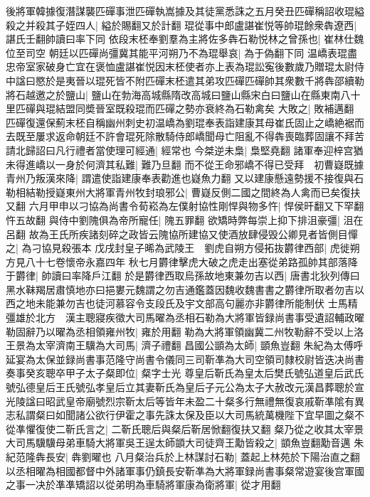 後將軍韓據復潛謀襲匹磾事泄匹磾執嵩據及其徒黨悉誅之五月癸丑匹磾稱詔收琨縊殺之并殺其子姪四人|{
	縊於賜翻又於計翻}
琨從事中郎盧諶崔悦等帥琨餘衆犇遼西|{
	諶氏壬翻帥讀曰率下同}
依段末柸奉劉羣為主將佐多犇石勒悦林之曾孫也|{
	崔林仕魏位至司空}
朝廷以匹磾尚彊冀其能平河朔乃不為琨舉哀|{
	為于偽翻下同}
温嶠表琨盡忠帝室家破身亡宜在褒恤盧諶崔悦因末柸使者亦上表為琨訟寃後數歲乃贈琨太尉侍中諡曰愍於是夷晉以琨死皆不附匹磾末柸遣其弟攻匹磾匹磾帥其衆數千將犇邵續勒將石越邀之於鹽山|{
	鹽山在勃海高城縣隋改高城曰鹽山縣宋白曰鹽山在縣東南八十里匹磾與琨結盟同奬晉室既殺琨而匹磾之勢亦衰終為石勒禽矣}
大敗之|{
	敗補邁翻}
匹磾復還保薊末柸自稱幽州刺史初温嶠為劉琨奉表詣建康其母崔氏固止之嶠絶裾而去既至屢求返命朝廷不許會琨死除散騎侍郎嶠聞母亡阻亂不得犇喪臨葬固讓不拜苦請北歸詔曰凡行禮者當使理可經通|{
	經常也}
今桀逆未梟|{
	梟堅堯翻}
諸軍奉迎梓宫猶未得進嶠以一身於何濟其私難|{
	難乃旦翻}
而不從王命邪嶠不得已受拜　初曹嶷既據青州乃叛漢來降|{
	謂遣使詣建康奉表勸進也嶷魚力翻}
又以建康懸遠勢援不接復與石勒相結勒授嶷東州大將軍青州牧封琅邪公|{
	曹嶷反側二國之間終為人禽而已矣復扶又翻}
六月甲申以刁協為尚書令荀崧為左僕射協性剛悍與物多忤|{
	悍侯旰翻又下罕翻忤五故翻}
與侍中劉隗俱為帝所寵任|{
	隗五罪翻}
欲矯時弊每崇上抑下排沮豪彊|{
	沮在呂翻}
故為王氏所疾諸刻碎之政皆云隗協所建協又使酒放肆侵毁公卿見者皆側目憚之|{
	為刁協見殺張本}
戊戌封皇子晞為武陵王　劉虎自朔方侵拓抜欝律西部|{
	虎徙朔方見八十七卷懷帝永嘉四年}
秋七月欝律擊虎大破之虎走出塞從弟路孤帥其部落降于欝律|{
	帥讀曰率降戶江翻}
於是欝律西取烏孫故地東兼勿吉以西|{
	唐書北狄列傳曰黑水靺羯居肅慎地亦曰挹婁元魏謂之勿吉通鑑蓋因魏收魏書書之欝律所取者勿吉以西之地未能兼勿吉也徒河慕容令支段氏及宇文部高句麗亦非欝律所能制伏}
士馬精彊雄於北方　漢主聰寢疾徵大司馬曜為丞相石勒為大將軍皆録尚書事受遺詔輔政曜勒固辭乃以曜為丞相領雍州牧|{
	雍於用翻}
勒為大將軍領幽冀二州牧勒辭不受以上洛王景為太宰濟南王驥為大司馬|{
	濟子禮翻}
昌國公顗為太師|{
	顗魚豈翻}
朱紀為太傅呼延宴為太保並録尚書事范隆守尚書令儀同三司靳凖為大司空領司隸校尉皆迭决尚書奏事癸亥聰卒甲子太子粲即位|{
	粲字士光}
尊皇后靳氏為皇太后樊氏號弘道皇后武氏號弘德皇后王氏號弘孝皇后立其妻靳氏為皇后子元公為太子大赦改元漢昌葬聰於宣光陵諡曰昭武皇帝廟號烈宗靳太后等皆年未盈二十粲多行無禮無復哀戚靳凖隂有異志私謂粲曰如聞諸公欲行伊霍之事先誅太保及臣以大司馬統萬機陛下宜早圖之粲不從凖懼復使二靳氏言之|{
	二靳氏聰后與粲后靳居惞翻復扶又翻}
粲乃從之收其太宰景大司馬驥驥母弟車騎大將軍吳王逞太師顗大司徒齊王勱皆殺之|{
	顗魚豈翻勱音邁}
朱紀范隆犇長安|{
	犇劉曜也}
八月粲治兵於上林謀討石勒|{
	蓋起上林苑於下陽治直之翻}
以丞相曜為相國都督中外諸軍事仍鎮長安靳凖為大將軍録尚書事粲常遊宴後宫軍國之事一决於凖凖矯詔以從弟明為車騎將軍康為衛將軍|{
	從才用翻}
